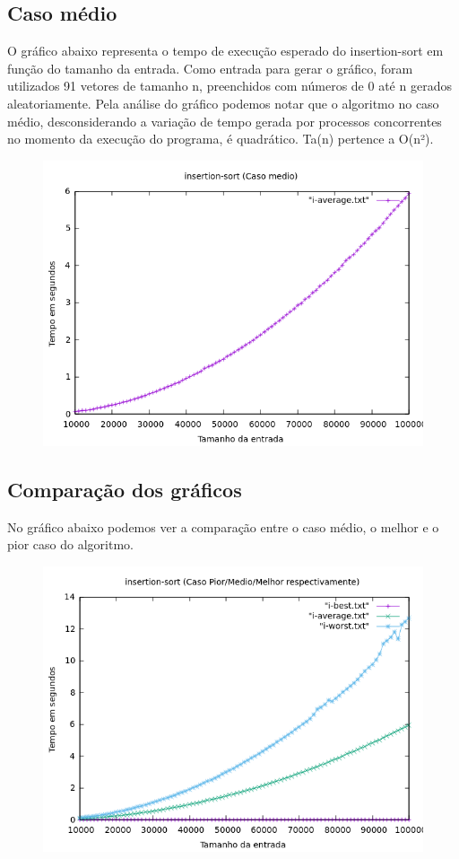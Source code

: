 \subsection{Caso médio}
O gráfico abaixo representa o tempo de execução esperado do insertion-sort em função do tamanho da entrada. Como entrada para gerar o gráfico, foram utilizados 91 vetores de tamanho n, preenchidos com números de 0 até n gerados aleatoriamente. Pela análise do gráfico podemos notar que o algoritmo no caso médio, desconsiderando a variação de tempo gerada por processos concorrentes no momento da execução do programa, é quadrático. Ta(n) pertence a O(n²).
\begin{figure}[h]
    \centering
    \includegraphics[width=1\linewidth]{Imagens/i-average.png}
\end{figure}

\newpage

\subsection{Comparação dos gráficos}
No gráfico abaixo podemos ver a comparação entre o caso médio, o melhor e o pior caso do algoritmo.
\begin{figure}[h]
    \centering
    \includegraphics[width=1\linewidth]{Imagens/i-baw.png}
\end{figure}

